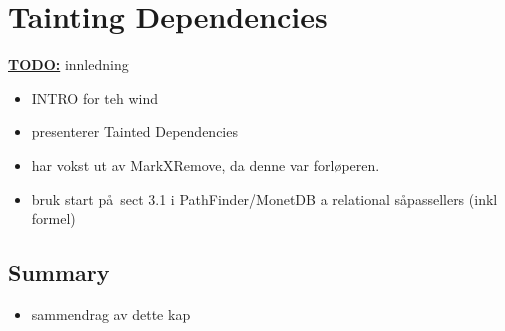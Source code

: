 \chapter{Tainting Dependencies}
\label{sect:translation}
\textbf{\underline{\LARGE TODO:}} innledning
\begin{itemize}
  \item INTRO for teh wind
  \item presenterer Tainted Dependencies
  \item har vokst ut av MarkXRemove, da denne var forl\o peren.
  \item bruk start p\aa~sect 3.1 i  PathFinder/MonetDB a relational s\aa passellers (inkl formel)
\end{itemize}














\section{Summary}
\label{sect:trans:summary}
\begin{itemize}
  \item sammendrag av dette kap
\end{itemize}